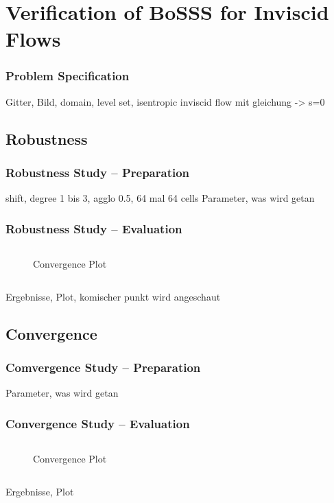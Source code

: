\section{Verification of BoSSS for Inviscid Flows}
\frame{\tableofcontents[currentsection]}
\begin{frame}
	\frametitle{Problem Specification}
Gitter, Bild, domain, level set, isentropic inviscid flow mit gleichung -> s=0
\end{frame}
	\subsection{Robustness}
	\begin{frame}
		\frametitle{Robustness Study -- Preparation}
		shift, degree 1 bis 3, agglo 0.5, 64 mal 64 cells
		Parameter, was wird getan
	\end{frame}
	\begin{frame}
		\frametitle{Robustness Study -- Evaluation}
		\begin{columns}[t]
	\column[]{4cm}
	\column[]{8cm}
			\begin{figure}[htp]	
				\vspace{-1cm}
				\centering
				
				\caption{Convergence Plot}
				\label{shifterror}
			\end{figure}
		\end{columns}
		Ergebnisse, Plot, komischer punkt wird angeschaut
	\end{frame}
	\subsection{Convergence}
	\begin{frame}
		\frametitle{Comvergence Study -- Preparation}
		Parameter, was wird getan
	\end{frame}
	\begin{frame}
		\frametitle{Convergence Study -- Evaluation}
		\begin{columns}[t]
			\column[]{4cm}
			\column[]{8cm}
		\begin{figure}[htp]
			\vspace{-1cm}
			\centering		
			
			\caption{Convergence Plot}
			\label{mesherror}
		\end{figure}
		\end{columns}
		Ergebnisse, Plot
	\end{frame}